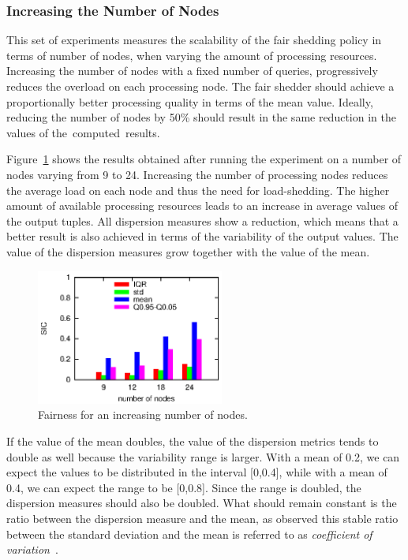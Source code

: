 \subsubsection*{Increasing the Number of Nodes}

This set of experiments measures the scalability of the fair shedding policy in terms of
number of nodes, when varying the amount of processing
resources. Increasing the number of nodes with a fixed number of queries,
progressively reduces the overload on each processing node. The fair shedder should achieve a
proportionally better processing quality in terms of the mean \sic value. Ideally, reducing the number of
nodes by 50\% should result in the same reduction in the \sic values of the~computed~results.

Figure~\ref{fig:scalability:nodes} shows the results obtained after running the experiment on a number of
nodes varying from 9 to 24. Increasing the number of processing nodes reduces the average load
on each node and thus the need for \mbox{load-shedding}. The higher amount of available processing
resources leads to an increase in average \sic values of the output tuples. 
All dispersion measures show a reduction, which means that a better result is also achieved in terms
of the variability of the output \sic values. The value of the dispersion measures grow together with
the value of the mean. 
\begin{figure}[h!]
\centering
\includegraphics[width=0.55\textwidth]{img/tesi/nodes2}
\caption{Fairness for an increasing number of nodes.}
\label{fig:scalability:nodes}
\end{figure}
If the value of the mean doubles, the value of the dispersion metrics
tends to double as well because the variability range is larger. With a mean of 0.2, we can expect the
\sic values to be distributed in the interval [0,0.4], while with a mean of 0.4, we can expect the range
to be [0,0.8]. Since the range is doubled, the dispersion measures should also be doubled. What should
remain constant is the ratio between the dispersion measure and the mean, as observed this stable
ratio between the standard deviation and the mean is referred to as \emph{coefficient of
variation}~\cite{cvar}.
\vspace{-10pt}
